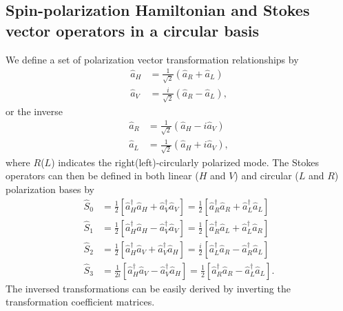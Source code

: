 \documentclass[preprint,aps,pra,onecolumn,superscriptaddress]{revtex4-1} %
\begin{document}
\begin{appendix}
\subsection{Spin-polarization Hamiltonian and Stokes vector operators in a circular basis}
We define a set of polarization vector transformation relationships by 
\begin{subequations}
\begin{align}
\hat{a}_H &= \frac{1}{\sqrt{2}}(\hat{a}_R+\hat{a}_L )\\
\hat{a}_V &= \frac{i}{\sqrt{2}}(\hat{a}_R-\hat{a}_L ),
\end{align}
\end{subequations}
or the inverse
\begin{subequations}
\begin{align}
\hat{a}_R &= \frac{1}{\sqrt{2}}(\hat{a}_H-i\hat{a}_V )\\
\hat{a}_L &= \frac{1}{\sqrt{2}}(\hat{a}_H+i\hat{a}_V ),
\end{align}
\end{subequations}
where $ R $($ L $) indicates the right(left)-circularly polarized mode.
The Stokes operators can then be defined in both linear ($ H $ and $ V $) and circular ($ L $ and $ R $) polarization bases by
\begin{subequations}\label{eq:SaHVaRL}
\begin{align}
\hat{S}_0 &= \frac{1}{2} \left[\hat{a}_H^\dagger\hat{a}_H+\hat{a}_V^\dagger\hat{a}_V \right] = \frac{1}{2} \left[\hat{a}_R^\dagger\hat{a}_R+\hat{a}_L^\dagger\hat{a}_L \right]\\
\hat{S}_1 &= \frac{1}{2} \left[\hat{a}_H^\dagger\hat{a}_H-\hat{a}_V^\dagger\hat{a}_V \right] = \frac{1}{2} \left[\hat{a}_R^\dagger\hat{a}_L+\hat{a}_L^\dagger\hat{a}_R \right]\\
\hat{S}_2 &= \frac{1}{2} \left[\hat{a}_H^\dagger\hat{a}_V+\hat{a}_V^\dagger\hat{a}_H \right] = \frac{i}{2} \left[\hat{a}_L^\dagger\hat{a}_R-\hat{a}_R^\dagger\hat{a}_L \right]\\
\hat{S}_3 &= \frac{1}{2i} \left[\hat{a}_H^\dagger\hat{a}_V-\hat{a}_V^\dagger\hat{a}_H \right] = \frac{1}{2} \left[\hat{a}_R^\dagger\hat{a}_R-\hat{a}_L^\dagger\hat{a}_L \right].
\end{align}
\end{subequations}
The inversed transformations can be easily derived by inverting the transformation coefficient matrices. 


\end{appendix}
\end{document}
